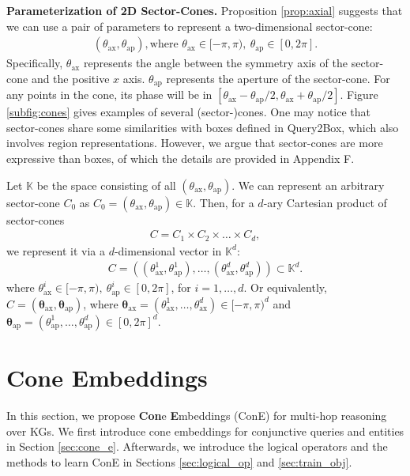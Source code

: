 \documentclass{article}
\newcommand{\gb}[1]{\boldsymbol{#1}}
\newcommand{\taxis}{\text{ax}}
\newcommand{\targ}{\text{ap}}
\begin{document}
\textbf{Parameterization of 2D Sector-Cones.}
Proposition \ref{prop:axial} suggests that we can use a pair of parameters to represent a two-dimensional sector-cone:
\begin{align*}
    (\theta_{\taxis}, \theta_{\targ}), \text{where }  \theta_{\taxis}\in [-\pi,\pi),\ \theta_{\targ}\in [0,2\pi].
\end{align*}
Specifically, $\theta_{\taxis}$ represents the angle between the symmetry axis of the sector-cone and the positive $x$ axis. $\theta_{\targ}$ represents the aperture of the sector-cone. For any points in the cone, its phase will be in $[\theta_{\taxis}-\theta_{\targ}/2, \theta_{\taxis}+\theta_{\targ}/2]$.
Figure \ref{subfig:cones} gives examples of several (sector-)cones. One may notice that sector-cones share some similarities with boxes defined in Query2Box, which also involves region representations. However, we argue that sector-cones are more expressive than boxes, of which the details are provided in Appendix F.


Let $\mathbb{K}$ be the space consisting of all $(\theta_{\taxis}, \theta_{\targ})$. We can represent an arbitrary sector-cone $C_0$ as $C_0=(\theta_{\taxis}, \theta_{\targ})\in \mathbb{K}$.
Then, for a $d$-ary Cartesian product of sector-cones
\begin{align}\label{eqn:cartesian}
     C=C_1\times C_2\times \ldots\times C_d,
\end{align}
we represent it via a $d$-dimensional vector in $\mathbb{K}^d$:
\begin{align}\label{eqn:param}
    C=\left((\theta_{\taxis}^1, \theta_{\targ}^1), \dots, (\theta_{\taxis}^d, \theta_{\targ}^d)\right)\subset \mathbb{K}^d.
\end{align}
where $\theta_{\taxis}^i\in [-\pi,\pi),\ \theta_{\targ}^i\in [0,2\pi]$, for $i=1,\dots,d$.
Or equivalently, $C=(\gb{\theta}_{\taxis}, \gb{\theta}_{\targ})$,
where $\gb{\theta}_{\taxis}=(\theta_{\taxis}^1,\dots,\theta_{\taxis}^d)\in[-\pi,\pi)^d$ and $\gb{\theta}_{\targ}=(\theta_{\targ}^1,\dots,\theta_{\targ}^d)\in[0,2\pi]^d$.

\section{Cone Embeddings}\label{sec:methods}
In this section, we propose \textbf{Con}e \textbf{E}mbeddings (ConE) for multi-hop reasoning over KGs.
We first introduce cone embeddings for conjunctive queries and entities in Section \ref{sec:cone_e}. Afterwards, we introduce the logical operators and the methods to learn ConE in Sections \ref{sec:logical_op} and \ref{sec:train_obj}. 
\end{document}
